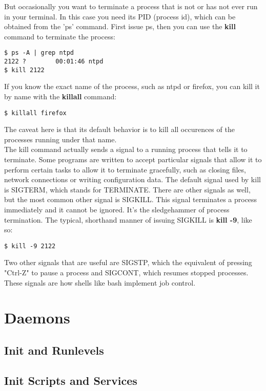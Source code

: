 But occasionally you want to terminate a process that is not or has not ever run in your terminal.  In this case you need its PID (process id), which can be obtained from the 'ps' command.  First issue ps, then you can use the \textbf{kill} command to terminate the process:

\begin{verbatim}
$ ps -A | grep ntpd
2122 ?        00:01:46 ntpd
$ kill 2122
\end{verbatim}

If you know the exact name of the process, such as ntpd or firefox, you can kill it by name with the \textbf{killall} command:

\begin{verbatim}
$ killall firefox
\end{verbatim}

The caveat here is that its default behavior is to kill all occurences of the processes running under that name.\\

The kill command actually sends a signal to a running process that tells it to terminate.  Some programs are written to accept particular signals that allow it to perform certain tasks to allow it to terminate gracefully, such as closing files, network connections or writing configuration data.   The default signal used by kill is SIGTERM, which stands for TERMINATE.  There are other signals as well, but the most common other signal is SIGKILL.  This signal terminates a process immediately and it cannot be ignored.  It's the sledgehammer of process termination.  The typical, shorthand manner of issuing SIGKILL is \textbf{kill -9}, like so:

\begin{verbatim}
$ kill -9 2122
\end{verbatim}

Two other signals that are useful are SIGSTP, which the equivalent of pressing "Ctrl-Z" to pause a process and SIGCONT, which resumes stopped processes.  These signals are how shells like bash implement job control.

\section{Daemons}

\subsection{Init and Runlevels}

\subsection{Init Scripts and Services}
